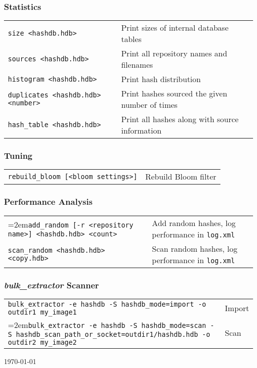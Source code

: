 \documentclass[12pt]{article}
\newcommand{\bulk}{\emph{bulk\_extractor}\xspace}
\begin{document}
\subsubsection*{Statistics}
\begin{tabular}{p{8 cm} p{9 cm} }
\texttt{size <hashdb.hdb>} & Print sizes of internal database tables \\
\texttt{sources <hashdb.hdb>} & Print all repository names and filenames \\
\texttt{histogram <hashdb.hdb>} & Print hash distribution \\
\texttt{duplicates <hashdb.hdb> <number>} & Print hashes sourced the given number of times \\
\texttt{hash\_table <hashdb.hdb>} & Print all hashes along with source information\\
\end{tabular}

\subsubsection*{Tuning}
\begin{tabular}{p{8 cm} p{9 cm} }
\texttt{rebuild\_bloom [<bloom settings>]} & Rebuild Bloom filter \\
\end{tabular}

\subsubsection*{Performance Analysis}
\begin{tabular}{p{8 cm} p{9 cm} }
\hangindent=2em\texttt{add\_random [-r <repository name>] <hashdb.hdb> <count>} & Add random hashes, log performance in \texttt{log.xml}\\
\texttt{scan\_random <hashdb.hdb> <copy.hdb>} & Scan random hashes, log performance in \texttt{log.xml}\\
\end{tabular}

\subsubsection*{\bulk Scanner}
\begin{tabular}{p{15 cm} p{4 cm} }
\texttt{bulk\_extractor -e hashdb -S hashdb\_mode=import -o outdir1 my\_image1} & Import \\
\hangindent=2em\texttt{bulk\_extractor -e hashdb -S hashdb\_mode=scan -S hashdb\_scan\_path\_or\_socket=outdir1/hashdb.hdb -o outdir2 my\_image2} & Scan \\
\end{tabular}

\vspace{2mm}
\begin{center}
\begin{footnotesize}
\today
\end{footnotesize}
\end{center}
\end{document}
